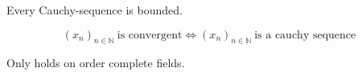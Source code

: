 \begin{theorem}\label{thm:cauchy_bound}
   Every Cauchy-sequence is bounded.
\end{theorem}

\begin{theorem}\label{thm:cauchy_crit_seq}
   \[(x_n)_{n \in \mathbb{N}}~\text{is convergent} \iff (x_n)_{n \in \mathbb{N}}~\text{is a cauchy sequence}\]
\end{theorem}
\begin{remark}
   Only holds on order complete fields.
\end{remark}


